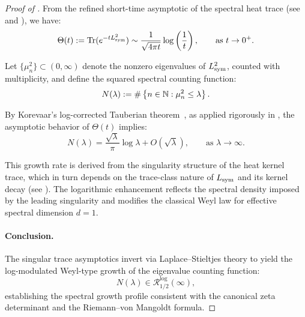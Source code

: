 \begin{proof}[Proof of ]
From the refined short-time asymptotic of the spectral heat trace (see  and ), we have:
\[
\Theta(t) := \operatorname{Tr}(e^{-t L_{\mathrm{sym}}^2}) \sim \frac{1}{\sqrt{4\pi t}} \log\left( \frac{1}{t} \right), \qquad \text{as } t \to 0^+.
\]

Let \( \{ \mu_n^2 \} \subset (0, \infty) \) denote the nonzero eigenvalues of \( L_{\mathrm{sym}}^2 \), counted with multiplicity, and define the squared spectral counting function:
\[
N(\lambda) := \#\left\{ n \in \mathbb{N} : \mu_n^2 \le \lambda \right\}.
\]

By Korevaar’s log-corrected Tauberian theorem~\cite[Ch.~III, §5]{Korevaar2004Tauberian}, as applied rigorously in , the asymptotic behavior of \( \Theta(t) \) implies:
\[
N(\lambda) = \frac{\sqrt{\lambda}}{\pi} \log \lambda + O(\sqrt{\lambda}), \qquad \text{as } \lambda \to \infty.
\]

This growth rate is derived from the singularity structure of the heat kernel trace, which in turn depends on the trace-class nature of \( L_{\mathrm{sym}} \) and its kernel decay (see ). The logarithmic enhancement reflects the spectral density imposed by the leading singularity and modifies the classical Weyl law for effective spectral dimension \( d = 1 \).

\paragraph{Conclusion.}
The singular trace asymptotics invert via Laplace–Stieltjes theory to yield the log-modulated Weyl-type growth of the eigenvalue counting function:
\[
N(\lambda) \in \mathcal{R}_{1/2}^{\log}(\infty),
\]
establishing the spectral growth profile consistent with the canonical zeta determinant and the Riemann–von Mangoldt formula.
\end{proof}
